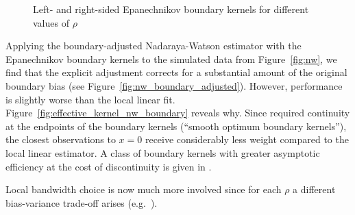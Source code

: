 \begin{figure}
	\centering
	\qquad
	\caption{Left- and right-sided Epanechnikov boundary kernels for different values of $\rho$}
	\label{fig:epanechnikov_boundary}
\end{figure}

Applying the boundary-adjusted Nadaraya-Watson estimator with the Epanechnikov boundary kernels to the simulated data from Figure~\ref{fig:nw},
we find that the explicit adjustment corrects for a substantial amount of the original boundary bias (see Figure~\ref{fig:nw_boundary_adjusted}).
However, performance is slightly worse than the local linear fit.
Figure~\ref{fig:effective_kernel_nw_boundary} reveals why.
Since \textcite{Müller_1991} required continuity at the endpoints of the boundary kernels (\enquote{smooth optimum boundary kernels}),
the closest observations to $x = 0$ receive considerably less weight compared to the local linear estimator.
A class of boundary kernels with greater asymptotic efficiency at the cost of discontinuity is given in \textcite{Müller_1994}.

\begin{remark}
	Local bandwidth choice is now much more involved since for each $\rho$ a different bias-variance trade-off arises
	(e.g.\ \cite[Section 4]{Müller_1991}).
\end{remark}